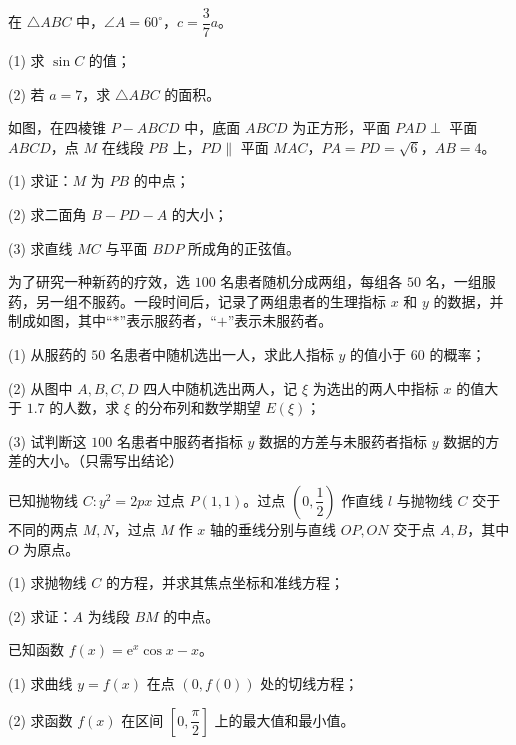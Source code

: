 \begin{question}
在 $\triangle ABC$ 中，$\angle A=60^\circ$，$c=\dfrac37a$。

(1) 求 $\sin C$ 的值；

(2) 若 $a=7$，求 $\triangle ABC$ 的面积。

\Needspace{0.4\textheight}
\end{question}
\begin{question}
如图，在四棱锥 $P-ABCD$ 中，底面 $ABCD$ 为正方形，平面 $PAD\perp$ 平面 $ABCD$，点 $M$ 在线段 $PB$ 上，$PD\parallel$ 平面 $MAC$，$PA=PD=\sqrt6$，$AB=4$。

(1) 求证：$M$ 为 $PB$ 的中点；

(2) 求二面角 $B-PD-A$ 的大小；

(3) 求直线 $MC$ 与平面 $BDP$ 所成角的正弦值。
\nopagebreak[4]
\begin{center}\end{center}
\nopagebreak[4]
\Needspace{0.4\textheight}
\end{question}
\begin{question}
为了研究一种新药的疗效，选 $100$ 名患者随机分成两组，每组各 $50$ 名，一组服药，另一组不服药。一段时间后，记录了两组患者的生理指标 $x$ 和 $y$ 的数据，并制成如图，其中“$\ast$”表示服药者，“$+$”表示未服药者。
\nopagebreak[4]
\begin{center}\end{center}
\nopagebreak[4]
(1) 从服药的 $50$ 名患者中随机选出一人，求此人指标 $y$ 的值小于 $60$ 的概率；

(2) 从图中 $A,B,C,D$ 四人中随机选出两人，记 $\xi$ 为选出的两人中指标 $x$ 的值大于 $1.7$ 的人数，求 $\xi$ 的分布列和数学期望 $E(\xi)$；

(3) 试判断这 $100$ 名患者中服药者指标 $y$ 数据的方差与未服药者指标 $y$ 数据的方差的大小。（只需写出结论）

\end{question}
\begin{question}
已知抛物线 $C:y^2=2px$ 过点 $P(1,1)$。过点 $\left(0,\dfrac12\right)$ 作直线 $l$ 与抛物线 $C$ 交于不同的两点 $M,N$，过点 $M$ 作 $x$ 轴的垂线分别与直线 $OP,ON$ 交于点 $A,B$，其中 $O$ 为原点。

(1) 求抛物线 $C$ 的方程，并求其焦点坐标和准线方程；

(2) 求证：$A$ 为线段 $BM$ 的中点。

\end{question}
\begin{question}
已知函数 $f(x)=\mathrm e^x\cos x-x$。

(1) 求曲线 $y=f(x)$ 在点 $(0,f(0))$ 处的切线方程；

(2) 求函数 $f(x)$ 在区间 $\left[0,\dfrac\pi2\right]$ 上的最大值和最小值。

\end{question}
